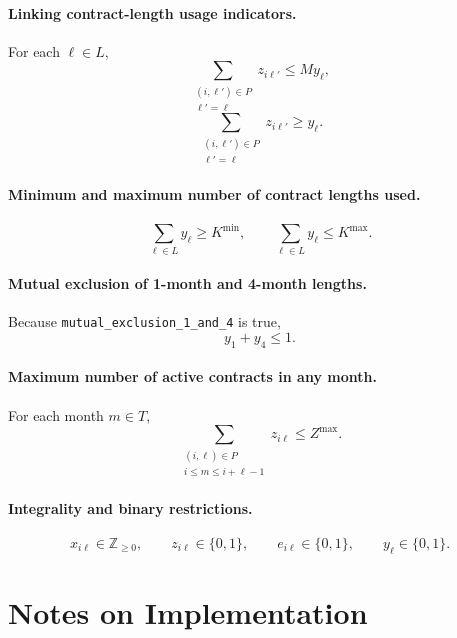 \paragraph{Linking contract-length usage indicators.}
For each $\ell\in L$,
\[
\sum_{\substack{(i,\ell')\in P\\ \ell'=\ell}} z_{i\ell'} \le M y_\ell,
\]
\[
\sum_{\substack{(i,\ell')\in P\\ \ell'=\ell}} z_{i\ell'} \ge y_\ell.
\]

\paragraph{Minimum and maximum number of contract lengths used.}
\[
\sum_{\ell\in L} y_\ell \ge K^{\min},
\qquad
\sum_{\ell\in L} y_\ell \le K^{\max}.
\]

\paragraph{Mutual exclusion of 1-month and 4-month lengths.}
Because \texttt{mutual\_exclusion\_1\_and\_4} is true,
\[
y_1 + y_4 \le 1.
\]

\paragraph{Maximum number of active contracts in any month.}
For each month $m\in T$,
\[
\sum_{\substack{(i,\ell)\in P\\ i\le m\le i+\ell-1}} z_{i\ell}
\le Z^{\max}.
\]

\paragraph{Integrality and binary restrictions.}
\[
x_{i\ell}\in \mathbb{Z}_{\ge 0},\qquad
z_{i\ell}\in\{0,1\},\qquad
e_{i\ell}\in\{0,1\},\qquad
y_\ell\in\{0,1\}.
\]

\section*{Notes on Implementation}

